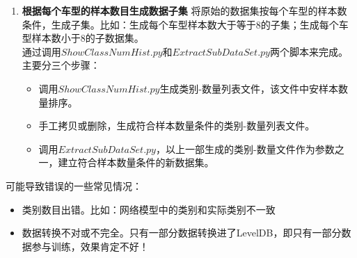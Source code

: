\documentclass{article}
\begin{document}
\begin{CJK}{UTF8}{gbsn}
\begin{enumerate}
     \item \textbf{根据每个车型的样本数目生成数据子集} 将原始的数据集按每个车型的样本数条件，生成子集。比如：生成每个车型样本数大于等于8的子集；生成每个车型样本数小于8的子数据集。\\
       通过调用$ShowClassNumHist.py$和$ExtractSubDataSet.py$两个脚本来完成。主要分三个步骤：\\
       \begin{itemize}
       \item 调用$ShowClassNumHist.py$生成类别-数量列表文件，该文件中安样本数量排序。
       \item 手工拷贝或删除，生成符合样本数量条件的类别-数量列表文件。
       \item 调用$ExtractSubDataSet.py$，以上一部生成的类别-数量文件作为参数之一，建立符合样本数量条件的新数据集。
       \end{itemize}
       

\end{enumerate}

可能导致错误的一些常见情况：
\begin{itemize}
\item 类别数目出错。比如：网络模型中的类别和实际类别不一致
\item 数据转换不对或不完全。只有一部分数据转换进了LevelDB，即只有一部分数据参与训练，效果肯定不好！

\end{itemize}


\end{CJK}
\end{document}
